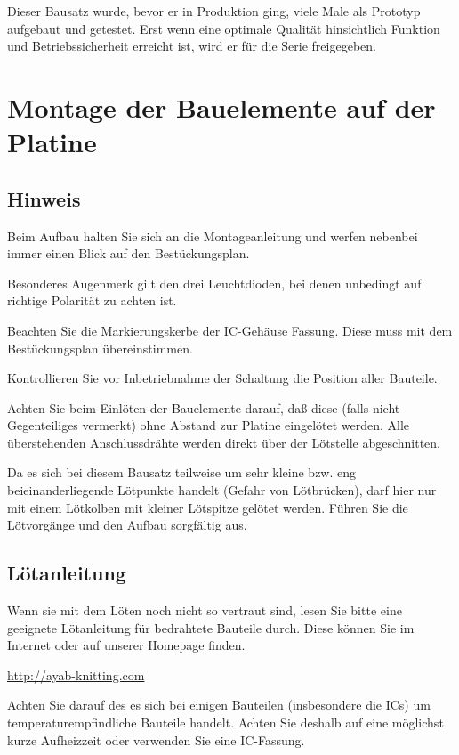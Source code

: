 \documentclass[fleqn,10pt]{SelfArx} %
\begin{document}
Dieser Bausatz wurde, bevor er in Produktion ging, viele Male als Prototyp aufgebaut und getestet. Erst wenn eine optimale Qualität hinsichtlich Funktion und Betriebssicherheit erreicht ist, wird er für die Serie freigegeben.


\section{Montage der Bauelemente auf der Platine}

 \subsection*{Hinweis}

Beim Aufbau halten Sie sich an die Montageanleitung und werfen nebenbei immer einen Blick auf den Bestückungsplan.

Besonderes Augenmerk gilt den drei Leuchtdioden, bei denen unbedingt auf richtige Polarität zu achten ist.

Beachten Sie die Markierungskerbe der IC-Gehäuse Fassung. Diese muss mit dem Bestückungsplan übereinstimmen.

Kontrollieren Sie vor Inbetriebnahme der Schaltung die Position aller Bauteile.

Achten Sie beim Einlöten der Bauelemente darauf, daß diese (falls nicht Gegenteiliges vermerkt) ohne Abstand zur Platine eingelötet werden. Alle überstehenden Anschlussdrähte werden direkt über der Lötstelle abgeschnitten.

Da es sich bei diesem Bausatz teilweise um sehr kleine bzw. eng beieinanderliegende Lötpunkte handelt (Gefahr von Lötbrücken), darf hier nur mit einem Lötkolben mit kleiner Lötspitze gelötet werden. Führen Sie die Lötvorgänge und den Aufbau sorgfältig aus.

 \subsection*{Lötanleitung}

Wenn sie mit dem Löten noch nicht so vertraut sind, lesen Sie bitte eine geeignete Lötanleitung für bedrahtete Bauteile durch. Diese können Sie im Internet oder auf unserer Homepage finden.

\url{http://ayab-knitting.com}

Achten Sie darauf des es sich bei einigen Bauteilen (insbesondere die ICs) um temperaturempfindliche Bauteile handelt. Achten Sie deshalb auf eine möglichst kurze Aufheizzeit oder verwenden Sie eine IC-Fassung.
\end{document}
